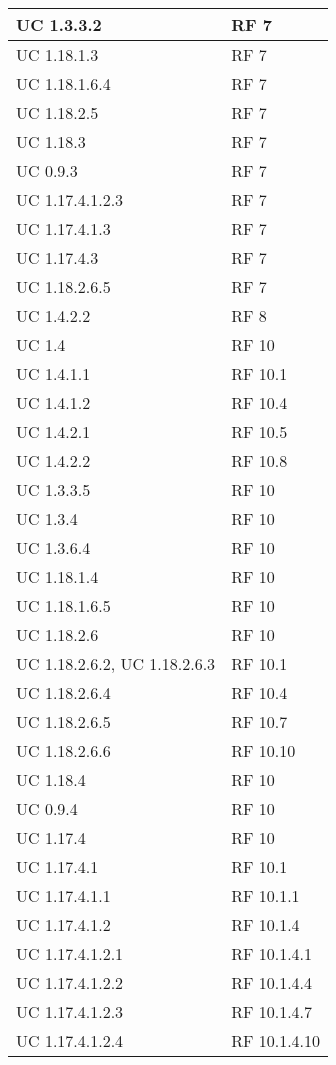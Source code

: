 {\begin{longtable} [c]{| p{4cm} | p{4cm} |}
 \hline 
UC 1.3.3.2 & RF 7\\ 
 \hline 
UC 1.18.1.3 & RF 7\\ 
 \hline 
UC 1.18.1.6.4 & RF 7\\ 
 \hline 
UC 1.18.2.5 & RF 7\\ 
 \hline 
UC 1.18.3 & RF 7\\ 
 \hline 
UC 0.9.3 & RF 7\\ 
 \hline 
UC 1.17.4.1.2.3 & RF 7\\ 
 \hline 
UC 1.17.4.1.3 & RF 7\\ 
 \hline 
UC 1.17.4.3 & RF 7\\ 
 \hline 
UC 1.18.2.6.5 & RF 7\\ 
 \hline 
UC 1.4.2.2 & RF 8\\ 
 \hline 
UC 1.4 & RF 10\\ 
 \hline 
UC 1.4.1.1 & RF 10.1\\ 
 \hline 
UC 1.4.1.2 & RF 10.4\\ 
 \hline 
UC 1.4.2.1 & RF 10.5\\ 
 \hline 
UC 1.4.2.2 & RF 10.8\\ 
 \hline 
UC 1.3.3.5 & RF 10\\ 
 \hline 
UC 1.3.4 & RF 10\\ 
 \hline 
UC 1.3.6.4 & RF 10\\ 
 \hline 
UC 1.18.1.4 & RF 10\\ 
 \hline 
UC 1.18.1.6.5 & RF 10\\ 
 \hline 
UC 1.18.2.6 & RF 10\\ 
 \hline 
UC 1.18.2.6.2, UC 1.18.2.6.3 & RF 10.1\\ 
 \hline 
UC 1.18.2.6.4 & RF 10.4\\ 
 \hline 
UC 1.18.2.6.5 & RF 10.7\\ 
 \hline 
UC 1.18.2.6.6 & RF 10.10\\ 
 \hline 
UC 1.18.4 & RF 10\\ 
 \hline 
UC 0.9.4 & RF 10\\ 
 \hline 
UC 1.17.4 & RF 10\\ 
 \hline 
UC 1.17.4.1 & RF 10.1\\ 
 \hline 
UC 1.17.4.1.1 & RF 10.1.1\\ 
 \hline 
UC 1.17.4.1.2 & RF 10.1.4\\ 
 \hline 
UC 1.17.4.1.2.1 & RF 10.1.4.1\\ 
 \hline 
UC 1.17.4.1.2.2 & RF 10.1.4.4\\ 
 \hline 
UC 1.17.4.1.2.3 & RF 10.1.4.7\\ 
 \hline 
UC 1.17.4.1.2.4 & RF 10.1.4.10\\ 

\end{longtable}}
